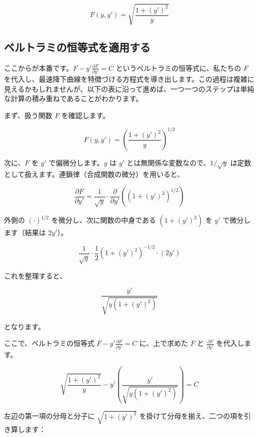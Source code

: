 \documentclass[12pt,a4paper]{ltjsarticle}
\begin{document}
\begin{equation}
F(y,y') = \sqrt{\frac{1 + (y')^2}{y}}
\end{equation}

\subsection{ベルトラミの恒等式を適用する}

ここからが本番です。$F - y' \frac{\partial F}{\partial y'} = C$ というベルトラミの恒等式に、私たちの $F$ を代入し、最速降下曲線を特徴づける方程式を導き出します。この過程は複雑に見えるかもしれませんが、以下の表に沿って進めば、一つ一つのステップは単純な計算の積み重ねであることがわかります。

まず、扱う関数 $F$ を確認します。

\begin{equation}
F(y, y') = \left( \frac{1+(y')^2}{y} \right)^{1/2}
\end{equation}

次に、$F$ を $y'$ で偏微分します。$y$ は $y'$ とは無関係な変数なので、$1/\sqrt{y}$ は定数として扱えます。連鎖律（合成関数の微分）を用いると、

\begin{equation}
\frac{\partial F}{\partial y'} = \frac{1}{\sqrt{y}} \cdot \frac{\partial}{\partial y'} \left( (1+(y')^2)^{1/2} \right)
\end{equation}

外側の $(\cdot)^{1/2}$ を微分し、次に関数の中身である $(1+(y')^2)$ を $y'$ で微分します（結果は $2y'$）。

\begin{equation}
\frac{1}{\sqrt{y}} \cdot \frac{1}{2} (1+(y')^2)^{-1/2} \cdot (2y')
\end{equation}

これを整理すると、

\begin{equation}
\frac{y'}{\sqrt{y(1+(y')^2)}}
\end{equation}

となります。

ここで、ベルトラミの恒等式 $F - y' \frac{\partial F}{\partial y'} = C$ に、上で求めた $F$ と $\frac{\partial F}{\partial y'}$ を代入します。

\begin{equation}
\sqrt{\frac{1+(y')^2}{y}} - y' \left( \frac{y'}{\sqrt{y(1+(y')^2)}} \right) = C
\end{equation}

左辺の第一項の分母と分子に $\sqrt{1+(y')^2}$ を掛けて分母を揃え、二つの項を引き算します：
\end{document}
